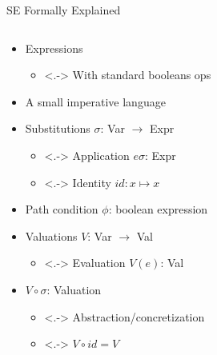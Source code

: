 \documentclass{beamer}
\begin{document}
\begin{frame}{SE Formally Explained~\parencite{boer2021}}
  \begin{columns}[t]
    \begin{column}{.6\textwidth}
      \begin{itemize}[<+->]
        \item Expressions
              \begin{itemize}
                \item<.-> With standard booleans ops
              \end{itemize}
        \item A small imperative language
        \item Substitutions $\sigma$: Var $\rightarrow$ Expr
              \begin{itemize}
                \item<.-> Application $e\sigma$: Expr
                \item<.-> Identity $id : x \mapsto x$
              \end{itemize}
        \item Path condition $\phi$: boolean expression
        \item Valuations $V$: Var $\rightarrow$ Val
              \begin{itemize}
                \item<.-> Evaluation $V(e)$: Val
              \end{itemize}
        \item $V \circ \sigma$: Valuation
              \begin{itemize}
                \item<.-> Abstraction/concretization
                \item<.-> $V \circ id = V$
              \end{itemize}
      \end{itemize}
    \end{column}


\end{columns}
\end{frame}
\end{document}
